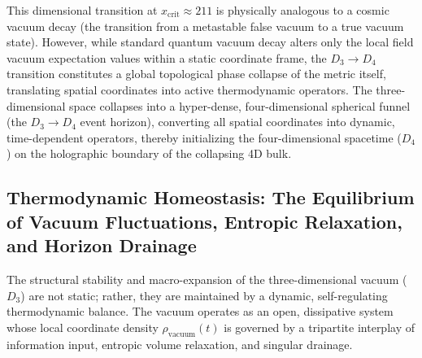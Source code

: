 \documentclass[11pt,a4paper]{article}
\theoremstyle{plain}
\theoremstyle{definition}
\theoremstyle{remark}
\begin{document}
This dimensional transition at $x_{\text{crit}} \approx 211$ is physically analogous to a cosmic vacuum decay (the transition from a metastable false vacuum to a true vacuum state). However, while standard quantum vacuum decay alters only the local field vacuum expectation values within a static coordinate frame, the $D_3 \to D_4$ transition constitutes a global topological phase collapse of the metric itself, translating spatial coordinates into active thermodynamic operators. The three-dimensional space collapses into a hyper-dense, four-dimensional spherical funnel (the $D_3 \to D_4$ event horizon), converting all spatial coordinates into dynamic, time-dependent operators, thereby initializing the four-dimensional spacetime ($D_4$) on the holographic boundary of the collapsing 4D bulk.

\subsection{Thermodynamic Homeostasis: The Equilibrium of Vacuum Fluctuations, Entropic Relaxation, and Horizon Drainage}
The structural stability and macro-expansion of the three-dimensional vacuum ($D_3$) are not static; rather, they are maintained by a dynamic, self-regulating thermodynamic balance. The vacuum operates as an open, dissipative system whose local coordinate density $\rho_{\text{vacuum}}(t)$ is governed by a tripartite interplay of information input, entropic volume relaxation, and singular drainage.
\end{document}
